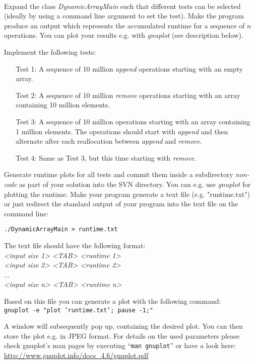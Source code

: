  \\
Expand the class \textit{DynamicArrayMain} such that different tests can be
selected (ideally by using a command line argument to set the test).
Make the program produce an output which represents the accumulated runtime
for a sequence of $n$ operations.
You can plot your results e.g. with \textit{gnuplot} (see description below).

Implement the following tests:
\begin{itemize}
  \item[Test 1:]
    A sequence of 10 million \textit{append} operations starting with an empty
    array.
  \item[Test 2:]
    A sequence of 10 million \textit{remove} operations starting with an array
    containing 10 million elements.
  \item[Test 3:]
    A sequence of 10 million operations starting with an array containing 1
    million elements.
    The operations should start with \textit{append} and then alternate after
    each reallocation between \textit{append} and \textit{remove}.
  \item[Test 4:]
    Same as Test 3, but this time starting with \textit{remove}.
\end{itemize}
Generate runtime plots for all tests and commit them inside a subdirectory
\textit{non-code} as part of your solution into the SVN directory.
You can e.g. use \textit{gnuplot} for plotting the runtime.
Make your program generate a text file (e.g. "runtime.txt") or just redirect
the standard output of your program into the text file on the command line:

\texttt{./DynamicArrayMain > runtime.txt}

The text file should have the following format:\\
\textit{<input size 1> <TAB> <runtime 1>}\\
\textit{<input size 2> <TAB> <runtime 2>}\\
...\\
\textit{<input size n> <TAB> <runtime n>}

Based on this file you can generate a plot with the following command:\\
\texttt{gnuplot -e "plot 'runtime.txt'; pause -1;"}

A window will subsequently pop up, containing the desired plot.
You can then store the plot e.g. in JPEG format.
For details on the used parameters please check gnuplot’s man pages by
executing \enquote{\texttt{man gnuplot}} or have a look here:
\url{http://www.gnuplot.info/docs\_4.6/gnuplot.pdf}